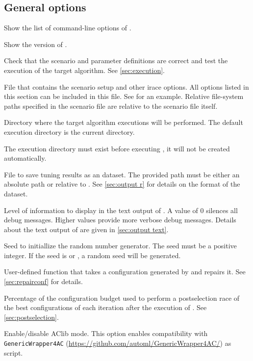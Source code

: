 


\subsection[General options]{General options}
\begin{description}
Show the list of command-line options of \irace.

Show the version of \irace.

Check that the scenario and parameter definitions are correct and test the execution of the target algorithm. See \autoref{sec:execution}.

File that contains the scenario setup and other irace options. All options listed in this section can be included in this file. See  for an example. Relative file-system paths specified in the scenario file are relative to the scenario file itself.

Directory where the target algorithm executions will be performed. The default execution directory is the current directory.
 \begin{xwarningbox}
 The execution directory must exist before executing \irace, it will not be created automatically.
\end{xwarningbox}

  File to save tuning results as an \aR dataset. The provided path must be either an absolute path or relative to . See \autoref{sec:output r} for details on the format of the \aR dataset.

Level of information to display in the text output of \irace. A value of 0 silences all debug messages. Higher values provide more verbose debug messages. Details about the text output of \irace are given in \autoref{sec:output text}.

Seed to initiallize the random number generator. The seed must be a positive integer. If the seed is  or , a random seed will be generated.

User-defined \aR function that takes a configuration generated by \irace and repairs it. See \autoref{sec:repairconf} for details.

Percentage of the configuration budget used to perform a postselection race of the best configurations of each iteration after the execution of \irace. See \autoref{sec:postselection}.

Enable/disable AClib mode. This option enables compatibility with \texttt{GenericWrapper4AC} (\url{https://github.com/automl/GenericWrapper4AC/}) as  script.

\end{description}

